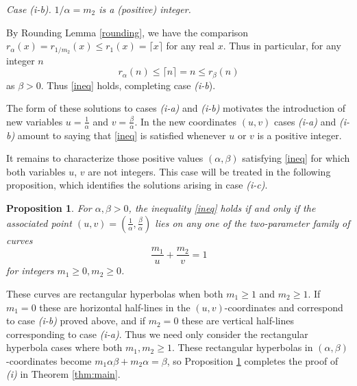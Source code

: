 \documentclass[12pt,letterpaper, reqno]{amsart}
\newtheorem{prop}[thm]{Proposition}
\theoremstyle{definition}
\theoremstyle{remark}
\newcommand{\RR}{\ensuremath{\mathbb{R}}}
\newcommand{\ZZ}{\ensuremath{\mathbb{Z}}}
\newcommand{\ceil}[1]{\lceil{#1}\rceil}
\begin{document}
{\em Case {\it (i-b)}.} {\em ${1}/{\alpha}=m_2$ is a (positive)  integer.}\smallskip

By Rounding Lemma \ref{rounding}, we have the comparison $r_\alpha(x) = r_{1/m_2}(x) \leq r_1(x) = \ceil{x}$ for any real $x$. Thus in particular, for any integer $n$
\[ r_\alpha(n) \leq \ceil{n} = n \leq r_\beta(n) \]
as $\beta>0$. Thus \eqref{ineq} holds, completing case {\it(i-b}). \medskip

The form of these solutions to cases {\it (i-a)} and {\it (i-b)} 
 motivates the introduction of new variables  $u= \frac{1}{\alpha}$ and $v= \frac{\beta}{\alpha}.$
In the new coordinates $(u,v)$ cases {\it (i-a)} and {\it (i-b)} amount to saying that \eqref{ineq} is satisfied whenever $u$ or $v$ is a positive integer.

 It remains to characterize those positive values $(\alpha, \beta)$
satisfying \eqref{ineq} for which  both  variables $u$, $v$ are not integers.
This case will be treated in the following proposition, which identifies the solutions arising  in  
case {\it (i-c)}. 

%
%
\begin{prop}\label{prop:31}
For $\alpha, \beta >0$, the inequality \eqref{ineq} holds if and only if the associated point $(u, v)= (\frac{1}{\alpha}, \frac{\beta}{\alpha})$ lies on any one of the two-parameter family of curves
$$\frac{m_1}{u} + \frac{m_2}{v} =1$$
 for integers $m_1 \ge 0, m_2 \ge 0$.
\end{prop}
These curves are rectangular hyperbolas when both $m_1 \ge 1$ and $m_2 \ge1$. If $m_1=0$ these are horizontal half-lines in the $(u,v)$-coordinates and correspond to  case {\it (i-b)} proved above, and if $m_2=0$ these are vertical half-lines corresponding to case {\it (i-a)}.
Thus we need only
consider the rectangular hyperbola cases where both $m_1, m_2 \ge 1$.
These rectangular hyperbolas in $(\alpha, \beta)$-coordinates
become $m_1 \alpha \beta + m_2 \alpha= \beta$,
so  Proposition \ref{prop:31} completes the proof of {\it (i)} in
Theorem \ref{thm:main}.
\end{document}

